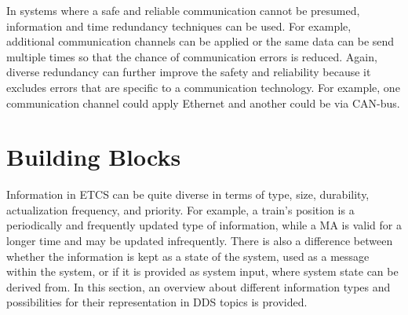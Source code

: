 In systems where a safe and reliable communication cannot be presumed, information and time redundancy techniques can be used.
For example, additional communication channels can be applied or the same data can be send multiple times so that the chance of communication errors is reduced.
Again, diverse redundancy can further improve the safety and reliability because it excludes errors that are specific to a communication technology.
For example, one communication channel could apply Ethernet and another could be via CAN-bus.
\section{ Building Blocks}

Information in \gls*{ETCS} can be quite diverse in terms of type, size, durability, actualization frequency, and priority.
For example, a train's position is a periodically and frequently updated type of information, while a \gls*{MA} is valid for a longer time and may be updated infrequently.
There is also a difference between whether the information is kept as a state of the system, used as a message within the system, or if it is provided as system input, where system state can be derived from.
In this section, an overview about different information types and possibilities for their representation in \gls*{DDS} topics is provided.

